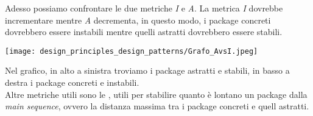 {    \newpage
    Adesso possiamo confrontare le due metriche \textit{I} e \textit{A}. La metrica \textit{I} dovrebbe incrementare mentre
    \textit{A} decrementa, in questo modo, i package concreti dovrebbero essere instabili mentre quelli astratti dovrebbero
    essere stabili.
    \begin{center}
        \texttt{[image: design\_principles\_design\_patterns/Grafo\_AvsI.jpeg]}
    \end{center}
    Nel grafico, in alto a sinistra troviamo i package astratti e stabili, in basso a destra i package concreti e instabili.
    \\
    Altre metriche utili sono le , utili per stabilire quanto è lontano
    un package dalla \textit{main sequence}, ovvero la distanza massima tra i package concreti e quell astratti.
    \begin{center}
    \end{center}
    \newpage

}